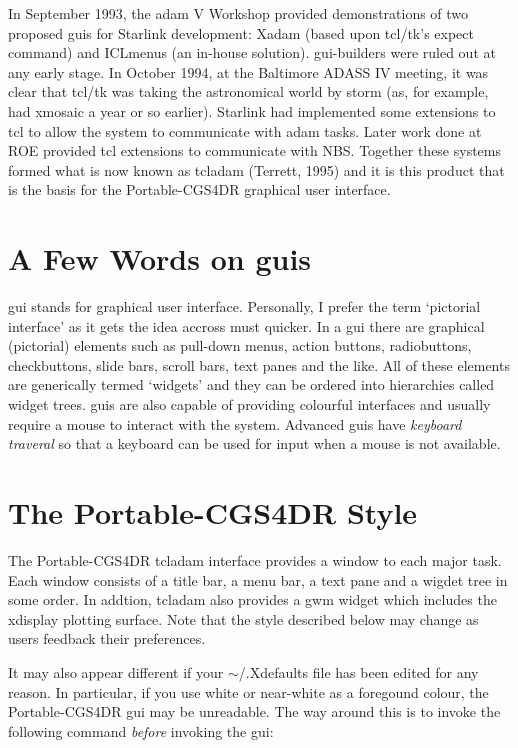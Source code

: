 \documentclass[a4paper]{book}
\renewcommand{\_}{{\tt\char'137}}
\begin{document}
In September 1993, the {\sc adam} V Workshop provided demonstrations of two
proposed {\sc gui}s for Starlink development: Xadam (based upon tcl/tk's expect
command) and ICLmenus (an in-house solution). {\sc gui}-builders were ruled out
at any early stage. In October 1994, at the Baltimore ADASS IV meeting, it
was clear that tcl/tk was taking the astronomical world by storm (as, for
example, had xmosaic a year or so earlier). Starlink had implemented some
extensions to tcl to allow the system to communicate with {\sc adam} tasks.
Later work done at ROE provided tcl extensions to communicate with NBS.
Together these systems formed what is now known as {\sc tcladam} (Terrett, 1995)
and it is this product that is the basis for the Portable-CGS4DR graphical
user interface. 

\section{A Few Words on {\sc gui}s}
{\sc gui} stands for graphical user interface. Personally, I prefer the term
`pictorial interface' as it gets the idea accross must quicker. In a {\sc gui}
there are graphical (pictorial) elements such as pull-down menus, action
buttons, radiobuttons, checkbuttons, slide bars, scroll bars, text panes
and the like. All of these elements are generically termed `widgets' and
they can be ordered into hierarchies called widget trees. {\sc gui}s are also
capable of providing colourful interfaces and usually require a mouse to
interact with the system. Advanced {\sc gui}s have {\em keyboard traveral} so
that a keyboard can be used for input when a mouse is not available. 

\section{The Portable-CGS4DR Style}
The Portable-CGS4DR {\sc tcladam} interface provides a window to each major
task. Each window consists of a title bar, a menu bar, a text pane and a
wigdet tree in some order. In addtion, {\sc tcladam} also provides a {\sc gwm} widget
which includes the xdisplay plotting surface. Note that the style described
below may change as users feedback their preferences. 

It may also appear different if your $\sim$/.Xdefaults file has been edited for any reason.
In particular, if you use white or near-white as a foregound colour, the Portable-CGS4DR
{\sc gui} may be unreadable. The way around this is to invoke the following command
{\em before} invoking the {\sc gui}:
\end{document}
